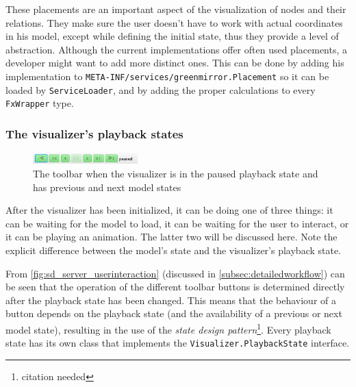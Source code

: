 \documentclass[a4paper]{article}
\begin{document}
	These placements are an important aspect of the visualization of nodes and their relations. They make sure the user doesn't have to work with actual coordinates in his model, except while defining the initial state, thus they provide a level of abstraction. Although the current implementations offer often used placements, a developer might want to add more distinct ones. This can be done by adding his implementation to \lstinline{META-INF/services/greenmirror.Placement} so it can be loaded by \lstinline{ServiceLoader}, and by adding the proper calculations to every \lstinline{FxWrapper} type.
	
	
	\subsubsection{The visualizer's playback states}\label{subsubsec:playbackstates}
	\begin{figure}\vspace{-20pt}
		\begin{center}
			\includegraphics[width=0.36\textwidth]{images/toolbar_paused_withsiblingstates}
		\end{center}
		\vspace{-10pt}\caption{The toolbar when the visualizer is in the paused playback state and has previous and next model states}\vspace{-12pt}
		\label{fig:toolbar}
	\end{figure}
	After the visualizer has been initialized, it can be doing one of three things: it can be waiting for the model to load, it can be waiting for the user to interact, or it can be playing an animation. The latter two will be discussed here. Note the explicit difference between the model's state and the visualizer's playback state.
	
	From \cref{fig:sd_server_userinteraction} (discussed in \cref{subsec:detailedworkflow}) can be seen that the operation of the different toolbar buttons is determined directly after the playback state has been changed. This means that the behaviour of a button depends on the playback state (and the availability of a previous or next model state), resulting in the use of the \emph{state design pattern}\footnote{citation needed}. Every playback state has its own class that implements the \lstinline{Visualizer.PlaybackState} interface.
	
\end{document}
